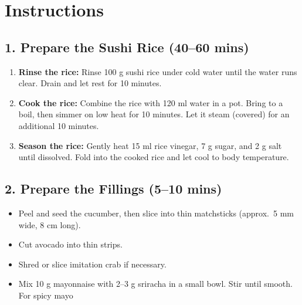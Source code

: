 \documentclass[landscape, a4paper]{article}
\newcommand\alert[1]{\textcolor{PrimaryColor}{\textbf{#1}}}
\begin{document}
\begin{minipage}[t]{0.31\textwidth}
	\vspace{0cm}
	\setlength{\parskip}{0.25cm}

	\section*{Instructions}
	\vspace{0.25cm}

	\subsection*{1. Prepare the Sushi Rice (40–60 mins)}
	\vspace{0.25cm}
	\begin{enumerate}
		\item \alert{Rinse the rice:} Rinse 100 g sushi rice under cold water until the water runs clear. Drain and let rest for 10 minutes.
		\item \alert{Cook the rice:} Combine the rice with 120 ml water in a pot. Bring to a boil, then simmer on low heat for 10 minutes. Let it steam (covered) for an additional 10 minutes.
		\item \alert{Season the rice:} Gently heat 15 ml rice vinegar, 7 g sugar, and 2 g salt until dissolved. Fold into the cooked rice and let cool to body temperature.
	\end{enumerate}

	\subsection*{2. Prepare the Fillings (5–10 mins)}
	\begin{itemize}
		\item Peel and seed the cucumber, then slice into thin matchsticks (approx.\ 5 mm wide, 8 cm long).
		\item Cut avocado into thin strips.
		\item Shred or slice imitation crab if necessary.
    \item Mix 10 g mayonnaise with 2–3 g sriracha in a small bowl. Stir until smooth. For spicy mayo 
	\end{itemize}


\end{minipage}
\end{document}
